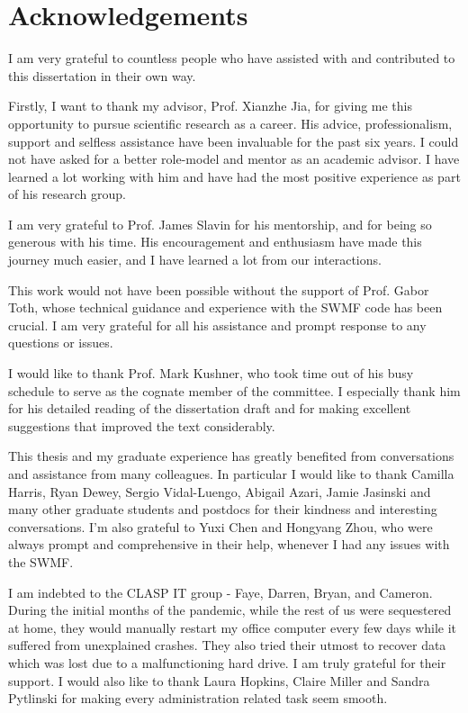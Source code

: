 \chapter{Acknowledgements}

I am very grateful to countless people who have assisted with and contributed to this dissertation in their own way.

Firstly, I want to thank my advisor, Prof. Xianzhe Jia, for giving me this opportunity to pursue scientific research as a career. His advice, professionalism, support and selfless assistance have been invaluable for the past six years. I could not have asked for a better role-model and mentor as an academic advisor. I have learned a lot working with him and have had the most positive experience as part of his research group. 

I am very grateful to Prof. James Slavin for his mentorship, and for being so generous with his time. His encouragement and enthusiasm have made this journey much easier, and I have learned a lot from our interactions. 

This work would not have been possible without the support of Prof. Gabor Toth, whose technical guidance and experience with the SWMF code has been crucial. I am very grateful for all his assistance and prompt response to any questions or issues.

I would like to thank Prof. Mark Kushner, who took time out of his busy schedule to serve as the cognate member of the committee. I especially thank him for his detailed reading of the dissertation draft and for making excellent suggestions that improved the text considerably. 

This thesis and my graduate experience has greatly benefited from conversations and assistance from many colleagues. In particular I would like to thank Camilla Harris, Ryan Dewey, Sergio Vidal-Luengo, Abigail Azari, Jamie Jasinski and many other graduate students and postdocs for their kindness and interesting conversations. I'm also grateful to Yuxi Chen and Hongyang Zhou, who were always prompt and comprehensive in their help, whenever I had any issues with the SWMF.  

I am indebted to the CLASP IT group - Faye, Darren, Bryan, and Cameron. During the initial months of the pandemic, while the rest of us were sequestered at home, they would manually restart my office computer every few days while it suffered from unexplained crashes. They also tried their utmost to recover data which was lost due to a malfunctioning hard drive. I am truly grateful for their support. I would also like to thank Laura Hopkins, Claire Miller and Sandra Pytlinski for making every administration related task seem smooth. 

